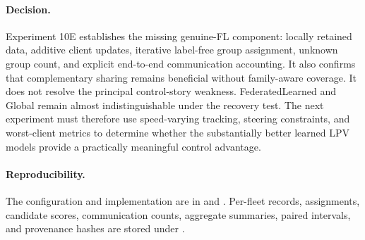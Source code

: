 \paragraph{Decision.}
Experiment 10E establishes the missing genuine-FL component: locally retained
data, additive client updates, iterative label-free group assignment, unknown
group count, and explicit end-to-end communication accounting. It also confirms
that complementary sharing remains beneficial without family-aware coverage.
It does not resolve the principal control-story weakness. FederatedLearned and
Global remain almost indistinguishable under the recovery test. The next
experiment must therefore use speed-varying tracking, steering constraints,
and worst-client metrics to determine whether the substantially better learned
LPV models provide a practically meaningful control advantage.

\paragraph{Reproducibility.}
The configuration and implementation are in
 and
. Per-fleet
records, assignments, candidate scores, communication counts, aggregate
summaries, paired intervals, and provenance hashes are stored under
.
